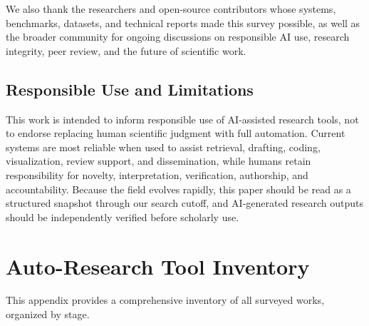 \documentclass{llmxive}
\providecommand{\beginappendix}{\appendix{\huge\sffamily Appendix\par}}
\begin{document}
We also thank the researchers and open-source contributors whose systems, benchmarks, datasets, and technical reports made this survey possible, as well as the broader community for ongoing discussions on responsible AI use, research integrity, peer review, and the future of scientific work.


\subsection*{Responsible Use and Limitations}
This work is intended to inform responsible use of AI-assisted research tools, not to endorse replacing human scientific judgment with full automation. Current systems are most reliable when used to assist retrieval, drafting, coding, visualization, review support, and dissemination, while humans retain responsibility for novelty, interpretation, verification, authorship, and accountability. Because the field evolves rapidly, this paper should be read as a structured snapshot through our search cutoff, and AI-generated research outputs should be independently verified before scholarly use.


\ifarxivmode
  \beginappendix
\else
  \appendices
\fi

\section{Auto-Research Tool Inventory}
\label{sec:appendix_inventory}

This appendix provides a comprehensive inventory of all surveyed works, organized by stage.
\end{document}
